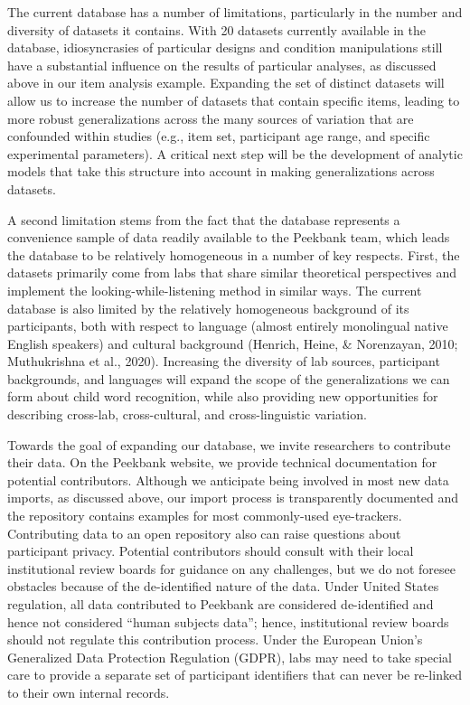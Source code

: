 \documentclass[
  english,
  man,floatsintext]{apa6}
\begin{document}
The current database has a number of limitations, particularly in the number and diversity of datasets it contains.
With 20 datasets currently available in the database, idiosyncrasies of particular designs and condition manipulations still have a substantial influence on the results of particular analyses, as discussed above in our item analysis example.
Expanding the set of distinct datasets will allow us to increase the number of datasets that contain specific items, leading to more robust generalizations across the many sources of variation that are confounded within studies (e.g., item set, participant age range, and specific experimental parameters).
A critical next step will be the development of analytic models that take this structure into account in making generalizations across datasets.

A second limitation stems from the fact that the database represents a convenience sample of data readily available to the Peekbank team, which leads the database to be relatively homogeneous in a number of key respects.
First, the datasets primarily come from labs that share similar theoretical perspectives and implement the looking-while-listening method in similar ways.
The current database is also limited by the relatively homogeneous background of its participants, both with respect to language (almost entirely monolingual native English speakers) and cultural background (Henrich, Heine, \& Norenzayan, 2010; Muthukrishna et al., 2020).
Increasing the diversity of lab sources, participant backgrounds, and languages will expand the scope of the generalizations we can form about child word recognition, while also providing new opportunities for describing cross-lab, cross-cultural, and cross-linguistic variation.

Towards the goal of expanding our database, we invite researchers to contribute their data.
On the Peekbank website, we provide technical documentation for potential contributors.
Although we anticipate being involved in most new data imports, as discussed above, our import process is transparently documented and the repository contains examples for most commonly-used eye-trackers.
Contributing data to an open repository also can raise questions about participant privacy.
Potential contributors should consult with their local institutional review boards for guidance on any challenges, but we do not foresee obstacles because of the de-identified nature of the data.
Under United States regulation, all data contributed to Peekbank are considered de-identified and hence not considered ``human subjects data''; hence, institutional review boards should not regulate this contribution process.
Under the European Union's Generalized Data Protection Regulation (GDPR), labs may need to take special care to provide a separate set of participant identifiers that can never be re-linked to their own internal records.
\end{document}
